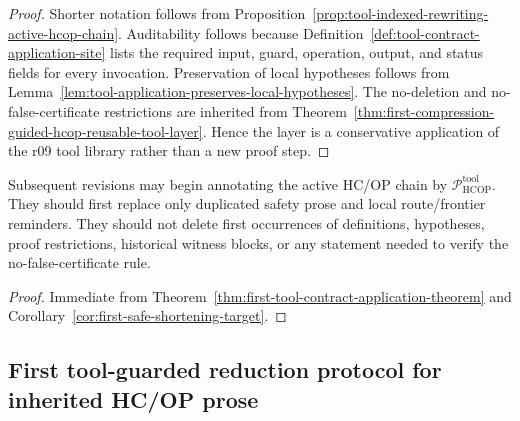 \begin{proof}
Shorter notation follows from Proposition~\ref{prop:tool-indexed-rewriting-active-hcop-chain}. Auditability follows because Definition~\ref{def:tool-contract-application-site} lists the required input, guard, operation, output, and status fields for every invocation. Preservation of local hypotheses follows from Lemma~\ref{lem:tool-application-preserves-local-hypotheses}. The no-deletion and no-false-certificate restrictions are inherited from Theorem~\ref{thm:first-compression-guided-hcop-reusable-tool-layer}. Hence the layer is a conservative application of the r09 tool library rather than a new proof step.
\end{proof}

\begin{corollary}
\label{cor:v3340-r10-working-rule}
Subsequent revisions may begin annotating the active HC/OP chain by \(\mathcal P_{\mathrm{HCOP}}^{\mathrm{tool}}\). They should first replace only duplicated safety prose and local route/frontier reminders. They should not delete first occurrences of definitions, hypotheses, proof restrictions, historical witness blocks, or any statement needed to verify the no-false-certificate rule.
\end{corollary}

\begin{proof}
Immediate from Theorem~\ref{thm:first-tool-contract-application-theorem} and Corollary~\ref{cor:first-safe-shortening-target}.
\end{proof}


\subsection{First tool-guarded reduction protocol for inherited HC/OP prose}
\label{subsec:first-tool-guarded-reduction-protocol-inherited-hcop-prose}

